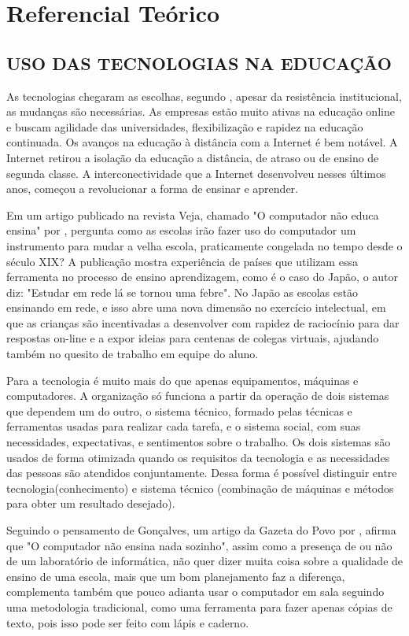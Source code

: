 \chapter[Referencial Teórico]{Referencial Teórico}

\section{USO DAS TECNOLOGIAS NA EDUCAÇÃO}

As tecnologias chegaram as escolhas, segundo , apesar da resistência institucional, as mudanças são necessárias. As empresas estão muito ativas na educação online e buscam agilidade das universidades, flexibilização e rapidez na educação continuada. Os avanços na educação à distância com a Internet é bem notável. A Internet retirou a isolação da educação a distância, de atraso ou de ensino de segunda classe. A interconectividade que a Internet desenvolveu nesses últimos anos, começou a revolucionar a forma de ensinar e aprender.
\par
Em um artigo publicado na revista Veja, chamado "O computador não educa ensina" por , pergunta como as escolas irão fazer uso do computador um instrumento para mudar a velha escola, praticamente congelada no tempo desde o século XIX? A publicação mostra experiência de países que utilizam essa ferramenta no processo de ensino aprendizagem, como é o caso do Japão, o autor diz: "Estudar em rede lá se tornou uma febre". No Japão as escolas estão ensinando em rede, e isso abre uma nova dimensão no exercício intelectual, em que as crianças são incentivadas a desenvolver com rapidez de raciocínio para dar respostas on-line e a expor ideias para centenas de colegas virtuais, ajudando também no quesito de trabalho em equipe do aluno.
\par
Para   a tecnologia é muito mais do que apenas equipamentos, máquinas e computadores. A organização só funciona a partir da operação de dois sistemas que dependem um do outro, o sistema técnico, formado pelas técnicas e ferramentas usadas para realizar cada tarefa, e o sistema social, com suas necessidades, expectativas, e sentimentos sobre o trabalho. Os dois sistemas são usados de forma otimizada quando os requisitos da tecnologia e as necessidades das pessoas são atendidos conjuntamente. Dessa forma é possível distinguir entre tecnologia(conhecimento) e sistema técnico (combinação de máquinas e métodos para obter um resultado desejado).
\par
Seguindo o pensamento de Gonçalves, um artigo da Gazeta do Povo por , afirma que "O computador não ensina nada sozinho", assim como a presença de ou não de um laboratório de informática, não quer dizer muita coisa sobre a qualidade de ensino de uma escola, mais que um bom planejamento faz a diferença, complementa também que pouco adianta usar o computador em sala seguindo uma metodologia tradicional, como uma ferramenta para fazer apenas cópias de texto, pois isso pode ser feito com lápis e caderno.

